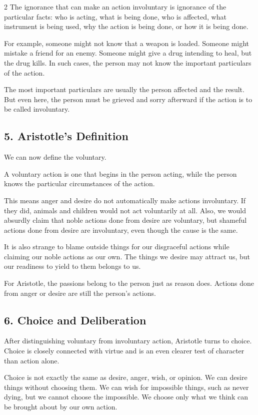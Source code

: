 \documentclass[12pt]{article}
\begin{document}
\begin{multicols}{2}
The ignorance that can make an action involuntary is ignorance of the particular facts: who is acting, what is being done, who is affected, what instrument is being used, why the action is being done, or how it is being done.

For example, someone might not know that a weapon is loaded. Someone might mistake a friend for an enemy. Someone might give a drug intending to heal, but the drug kills. In such cases, the person may not know the important particulars of the action.

The most important particulars are usually the person affected and the result. But even here, the person must be grieved and sorry afterward if the action is to be called involuntary.

\subsection*{5. Aristotle's Definition}
We can now define the voluntary.

A voluntary action is one that begins in the person acting, while the person knows the particular circumstances of the action.

This means anger and desire do not automatically make actions involuntary. If they did, animals and children would not act voluntarily at all. Also, we would absurdly claim that noble actions done from desire are voluntary, but shameful actions done from desire are involuntary, even though the cause is the same.

It is also strange to blame outside things for our disgraceful actions while claiming our noble actions as our own. The things we desire may attract us, but our readiness to yield to them belongs to us.

For Aristotle, the passions belong to the person just as reason does. Actions done from anger or desire are still the person's actions.

\subsection*{6. Choice and Deliberation}
After distinguishing voluntary from involuntary action, Aristotle turns to choice. Choice is closely connected with virtue and is an even clearer test of character than action alone.

Choice is not exactly the same as desire, anger, wish, or opinion. We can desire things without choosing them. We can wish for impossible things, such as never dying, but we cannot choose the impossible. We choose only what we think can be brought about by our own action.


\end{multicols}
\end{document}
